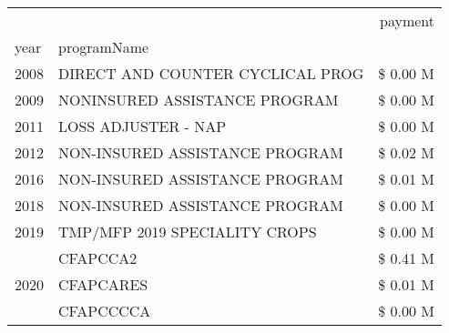 \begin{tabular}{llr}
\toprule
 &  & payment \\
year & programName &  \\
\midrule
2008 & DIRECT AND COUNTER CYCLICAL PROG & \$ 0.00 M \\
\cline{1-3}
2009 & NONINSURED ASSISTANCE PROGRAM & \$ 0.00 M \\
\cline{1-3}
2011 & LOSS ADJUSTER - NAP & \$ 0.00 M \\
\cline{1-3}
2012 & NON-INSURED ASSISTANCE PROGRAM & \$ 0.02 M \\
\cline{1-3}
2016 & NON-INSURED ASSISTANCE PROGRAM & \$ 0.01 M \\
\cline{1-3}
2018 & NON-INSURED ASSISTANCE PROGRAM & \$ 0.00 M \\
\cline{1-3}
2019 & TMP/MFP 2019 SPECIALITY CROPS & \$ 0.00 M \\
\cline{1-3}
\multirow[t]{3}{*}{2020} & CFAPCCA2 & \$ 0.41 M \\
 & CFAPCARES & \$ 0.01 M \\
 & CFAPCCCCA & \$ 0.00 M \\
\cline{1-3}
\bottomrule
\end{tabular}
